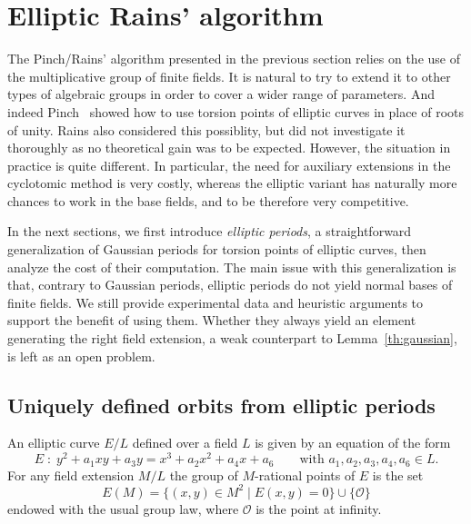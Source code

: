 \documentclass[12pt]{article}
\theoremstyle{plain}
\theoremstyle{definition}
\newcounter{algorithm}
\begin{document}

\section{Elliptic Rains' algorithm}
\label{sec:rains-elliptic}

The Pinch/Rains' algorithm presented in the previous section relies on the use
of the multiplicative group of finite fields.
It is natural to try to extend it to other types of algebraic groups in
order to cover a wider range of parameters.
And indeed Pinch~\cite{Pinch} showed how to use torsion points of elliptic
curves in place of roots of unity.
Rains also considered this possiblity, but did not investigate it thoroughly
as no theoretical gain was to be expected.
However, the situation in practice is quite different.
In particular, the need for auxiliary extensions in the cyclotomic method
is very costly, whereas the elliptic variant has naturally more chances
to work in the base fields, and to be therefore very competitive.

In the next sections, we first introduce \emph{elliptic periods}, a
straightforward generalization of Gaussian periods for torsion points
of elliptic curves,
then analyze the cost of their computation.
The main issue with this generalization is that, contrary to Gaussian periods,
elliptic periods do not yield normal bases of finite fields.
We still provide experimental data and heuristic arguments
to support the benefit of using them.
Whether they always yield an element generating the right field extension,
a weak counterpart to Lemma~\ref{th:gaussian}, is left as an open problem.

\subsection{Uniquely defined orbits from elliptic periods}
\label{sec:ellperiods}

An elliptic curve $E/L$ defined over a field $L$ is given by an
equation of the form
\begin{equation*}
  E\;:\; y^2 + a_1xy + a_3y = x^3 + a_2x^2 + a_4x + a_6
  \qquad\text{with $a_1,a_2,a_3,a_4,a_6\in L$.}
\end{equation*}
For any field extension $M/L$ the group of $M$-rational points of $E$
is the set
\begin{equation*}
  E(M) = \{(x,y)\in M^2 \mid E(x,y) = 0\} \cup \{\mathcal{O}\}
\end{equation*}
endowed with the usual group law, where $\mathcal{O}$ is the point at
infinity.
\end{document}
